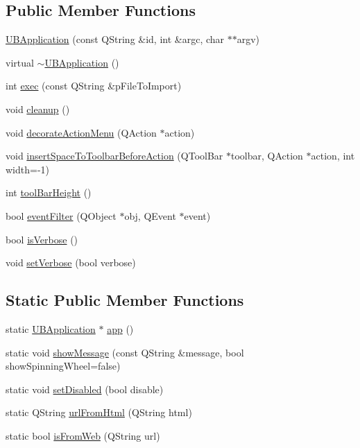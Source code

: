 \subsection*{Public Member Functions}
\begin{DoxyCompactItemize}
\item 
\hyperlink{class_u_b_application_aa24444ac89dc690b6b339635275d87c8}{U\-B\-Application} (const Q\-String \&id, int \&argc, char $\ast$$\ast$argv)
\item 
virtual \hyperlink{class_u_b_application_a1a8f6fe91c45577fb09cede704daebac}{$\sim$\-U\-B\-Application} ()
\item 
int \hyperlink{class_u_b_application_add1469239e71bf24fdc61413a42a38bd}{exec} (const Q\-String \&p\-File\-To\-Import)
\item 
void \hyperlink{class_u_b_application_a2df7b8c389f6d39fb984309331e55c4b}{cleanup} ()
\item 
void \hyperlink{class_u_b_application_a7a08fcdf80ae166433f4d1317fb16374}{decorate\-Action\-Menu} (Q\-Action $\ast$action)
\item 
void \hyperlink{class_u_b_application_adde68e147924747e76e51286b2ffc9e7}{insert\-Space\-To\-Toolbar\-Before\-Action} (Q\-Tool\-Bar $\ast$toolbar, Q\-Action $\ast$action, int width=-\/1)
\item 
int \hyperlink{class_u_b_application_a422feb60802fafd70e444b67dcbcf9f8}{tool\-Bar\-Height} ()
\item 
bool \hyperlink{class_u_b_application_ace44514d00d196ed5976552dedf9c070}{event\-Filter} (Q\-Object $\ast$obj, Q\-Event $\ast$event)
\item 
bool \hyperlink{class_u_b_application_af20c93ddff628a44fc9af9e7c4ee87d2}{is\-Verbose} ()
\item 
void \hyperlink{class_u_b_application_a25461423d114d696ebc3c1400e5babc9}{set\-Verbose} (bool verbose)
\end{DoxyCompactItemize}
\subsection*{Static Public Member Functions}
\begin{DoxyCompactItemize}
\item 
static \hyperlink{class_u_b_application}{U\-B\-Application} $\ast$ \hyperlink{class_u_b_application_a71985ce0344b74bc3e5ed1d7f44a2017}{app} ()
\item 
static void \hyperlink{class_u_b_application_afd12508537e75aaa6789431e60b60b44}{show\-Message} (const Q\-String \&message, bool show\-Spinning\-Wheel=false)
\item 
static void \hyperlink{class_u_b_application_ad2065dee2ad6d6958a69ed1ac2b3557c}{set\-Disabled} (bool disable)
\item 
static Q\-String \hyperlink{class_u_b_application_acb4388f1e2e5c3b1db136211011de165}{url\-From\-Html} (Q\-String html)
\item 
static bool \hyperlink{class_u_b_application_a3d6773c0ccf020c9fa35daba617bae91}{is\-From\-Web} (Q\-String url)
\end{DoxyCompactItemize}
